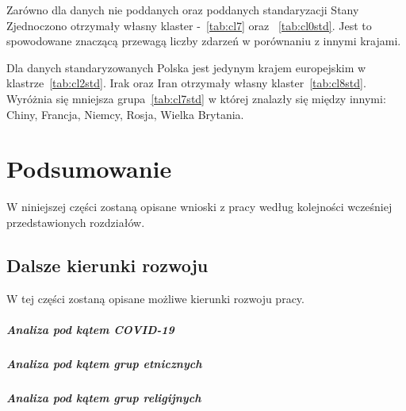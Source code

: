 \documentclass[11pt]{report}
\begin{document}
    Zarówno dla danych nie poddanych oraz poddanych standaryzacji Stany Zjednoczono otrzymały własny klaster -~\ref{tab:cl7} oraz ~\ref{tab:cl0std}.
    Jest to spowodowane znaczącą przewagą liczby zdarzeń w porównaniu z innymi krajami.

    Dla danych standaryzowanych Polska jest jedynym krajem europejskim w klastrze~\ref{tab:cl2std}.
    Irak oraz Iran otrzymały własny klaster~\ref{tab:cl8std}.
    Wyróżnia się mniejsza grupa~\ref{tab:cl7std} w której znalazły się między innymi: Chiny, Francja, Niemcy, Rosja, Wielka Brytania.


    \chapter{Podsumowanie}
    W niniejszej części zostaną opisane wnioski z pracy według kolejności wcześniej przedstawionych rozdziałów.


    \section{Dalsze kierunki rozwoju}
    W tej części zostaną opisane możliwe kierunki rozwoju pracy.

    \paragraph{Analiza pod kątem COVID-19}

    \paragraph{Analiza pod kątem grup etnicznych}

    \paragraph{Analiza pod kątem grup religijnych}



    \newpage
    \printbibliography[title={Bibliografia}]
\end{document}
